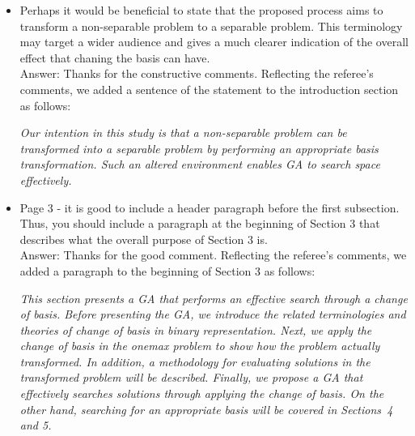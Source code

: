\documentclass[a4paper]{article}
\newenvironment*{qna}{%
	\newcommand{\comment}{\item \sf}%
	\newcommand{\answer}{\medskip\\Answer: \rm}%
	\newcommand*{\quotehead}{\medskip\par\rm}%
	\newcommand*{\quotetail}{\par\it}%
	\newcommand{\quoteit}{\medskip\par\it}%
	\begin{itemize}%
	}{%
	\end{itemize}\normalfont%
}
\begin{document}
\begin{qna}
\comment
	Perhaps it would be beneficial to state that the proposed process aims to
	transform a non-separable problem to a separable problem. This terminology
	may target a wider audience and gives a much clearer indication of the
	overall effect that chaning the basis can have.
\answer
	Thanks for the constructive comments. Reflecting the referee's comments, we added a sentence of the statement to the introduction section as follows:
\quoteit
	Our intention in this study is that a non-separable problem can be transformed into a separable problem by performing an appropriate basis transformation. Such an altered environment enables GA to search space effectively.
\end{qna}

\begin{qna}
\comment
	Page 3 - it is good to include a header paragraph before the first
	subsection. Thus, you should include a paragraph at the beginning of
	Section 3 that describes what the overall purpose of Section 3 is.
\answer
	Thanks for the good comment. Reflecting the referee's comments, we added a paragraph to the beginning of Section 3 as follows:
\quoteit
	This section presents a GA that performs an effective search through a change of basis. Before presenting the GA, we introduce the related terminologies and theories of change of basis in binary representation.
	Next, we apply the change of basis in the onemax problem to show how the problem actually transformed. In addition, a methodology for evaluating solutions in the transformed problem will be described.
	Finally, we propose a GA that effectively searches solutions through applying the change of basis.
	On the other hand, searching for an appropriate basis will be covered in Sections~4 and 5.
\end{qna}
\end{document}
